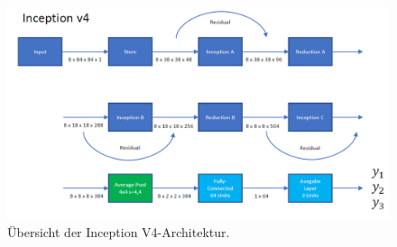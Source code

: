\newpage
\begin{figure}[H]
\centering
\thispagestyle{empty}
\includegraphics[angle=90, scale=0.75]{pictures/inception/InceptionV4}
\caption[Caption for LOF]{Übersicht der Inception V4-Architektur.}
\label{fig:incv4}
\end{figure}
 


